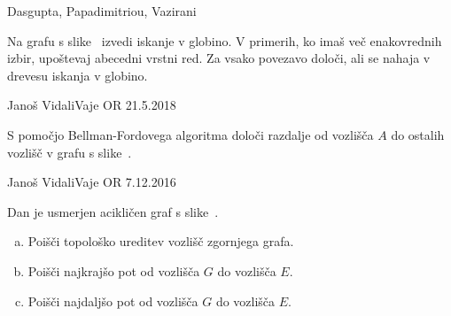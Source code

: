 \begin{naloga}%
{Dasgupta, Papadimitriou, Vazirani}{\cite[Exercise~3.1]{dpv}}
\begin{vprasanje}[dfs]
Na grafu s slike~ izvedi iskanje v globino.
V primerih, ko imaš več ena\-ko\-vred\-nih izbir,
upoštevaj abecedni vrstni red.
Za vsako povezavo določi, ali se nahaja v drevesu iskanja v globino.
\end{vprasanje}
\begin{odgovor}
\end{odgovor}
\end{naloga}


\begin{naloga}{Janoš Vidali}{Vaje OR 21.5.2018}
\begin{vprasanje}[bf]
S pomočjo Bellman-Fordovega algoritma
določi razdalje od vozlišča $A$ do ostalih vozlišč
v grafu s slike~\fig{}.

\begin{slika}
\pgfslika
{}
\end{slika}
\end{vprasanje}
\begin{odgovor}
\end{odgovor}
\end{naloga}


\begin{naloga}{Janoš Vidali}{Vaje OR 7.12.2016}
\begin{vprasanje}[topo]
Dan je usmerjen acikličen graf s slike~\fig{}.

\begin{enumerate}[(a)]
\item Poišči topološko ureditev vozlišč zgornjega grafa.

\item Poišči najkrajšo pot od vozlišča $G$ do vozlišča $E$.

\item Poišči najdaljšo pot od vozlišča $G$ do vozlišča $E$.
\end{enumerate}

\begin{slika}
\pgfslika
{}
\end{slika}
\end{vprasanje}
\begin{odgovor}
\end{odgovor}
\end{naloga}


